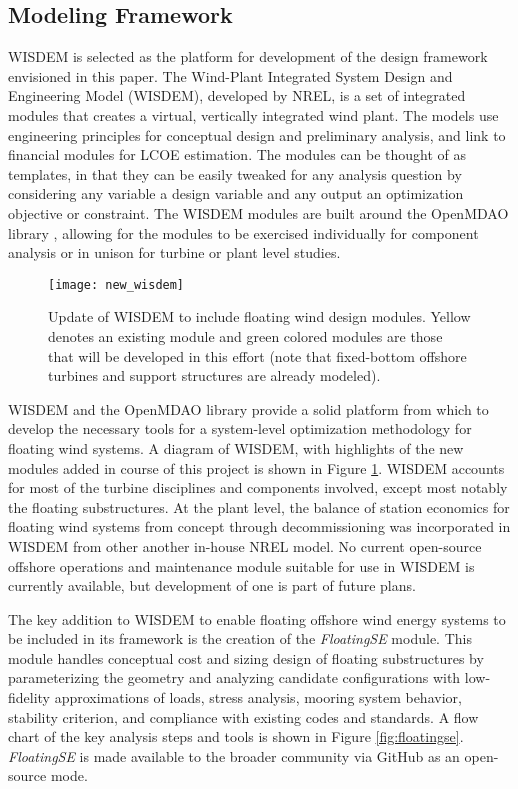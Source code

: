 \subsection{Modeling Framework}
WISDEM is selected as the platform for development of the design
framework envisioned in this paper.  The Wind-Plant Integrated System
Design and Engineering Model (WISDEM), developed by NREL, is a set of
integrated modules that creates a virtual, vertically integrated wind
plant. The models use engineering principles for conceptual design and
preliminary analysis, and link to financial modules for LCOE
estimation. The modules can be thought of as templates, in that they can
be easily tweaked for any analysis question by considering any variable
a design variable and any output an optimization objective or
constraint. The WISDEM modules are built around the OpenMDAO library \citep{openmdao},
allowing for the modules to be exercised individually for component
analysis or in unison for turbine or plant level studies.  

\begin{figure}[htbp]
  \begin{center}
    \texttt{[image: new\_wisdem]}\\
    \caption{Update of WISDEM to include floating wind design modules.
      Yellow denotes an existing module and green colored modules are
      those that will be developed in this effort (note that
      fixed-bottom offshore turbines and support structures are already
      modeled).}
    \label{fig:wisdem}
  \end{center}
\end{figure}

WISDEM and the OpenMDAO library provide a solid platform from which to
develop the necessary tools for a system-level optimization methodology
for floating wind systems.  A diagram of WISDEM, with highlights of the
new modules added in course of this project is shown in Figure
\ref{fig:wisdem}.  WISDEM accounts for most of the turbine disciplines
and components involved, except most notably the floating substructures.
At the plant level, the balance of station economics for floating wind
systems from concept through decommissioning was incorporated in WISDEM
from other another in-house NREL model.  No current open-source offshore
operations and maintenance module suitable for use in WISDEM is
currently available, but development of one is part of future plans.

The key addition to WISDEM to enable floating offshore wind energy
systems to be included in its framework is the creation of the
\textit{FloatingSE} module.  This module handles conceptual cost and
sizing design of floating substructures by parameterizing the geometry
and analyzing candidate configurations with low-fidelity approximations
of loads, stress analysis, mooring system behavior, stability criterion,
and compliance with existing codes and standards.  A flow chart of the
key analysis steps and tools is shown in Figure \ref{fig:floatingse}.
\textit{FloatingSE} is made available to the broader community via
GitHub as an open-source mode.


